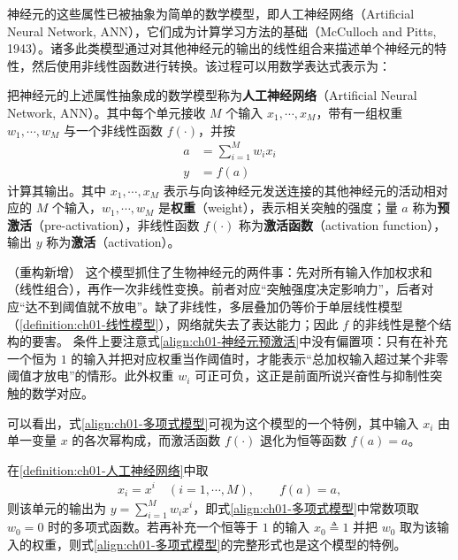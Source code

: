\documentclass[../../main.tex]{subfiles}
\begin{document}
神经元的这些属性已被抽象为简单的数学模型，即人工神经网络（Artificial Neural Network, ANN），它们成为计算学习方法的基础（McCulloch and Pitts, 1943）。诸多此类模型通过对其他神经元的输出的线性组合来描述单个神经元的特性，然后使用非线性函数进行转换。该过程可以用数学表达式表示为：

\begin{definition}[人工神经网络]\label{definition:ch01-人工神经网络}
把神经元的上述属性抽象成的数学模型称为\textbf{人工神经网络}（Artificial Neural Network, ANN）。其中每个单元接收 $M$ 个输入 $x_1,\cdots,x_M$，带有一组权重 $w_1,\cdots,w_M$ 与一个非线性函数 $f(\cdot)$，并按
\begin{align}
  a &= \sum_{i=1}^{M} w_i x_i \label{align:ch01-神经元预激活}\\
  y &= f(a) \label{align:ch01-神经元激活}
\end{align}
计算其输出。其中 $x_1,\cdots,x_M$ 表示与向该神经元发送连接的其他神经元的活动相对应的 $M$ 个输入，$w_1,\cdots,w_M$ 是\textbf{权重}（weight），表示相关突触的强度；量 $a$ 称为\textbf{预激活}（pre-activation），非线性函数 $f(\cdot)$ 称为\textbf{激活函数}（activation function），输出 $y$ 称为\textbf{激活}（activation）。
\end{definition}

\begin{remark}（重构新增）
这个模型抓住了生物神经元的两件事：先对所有输入作加权求和（线性组合），再作一次非线性变换。前者对应“突触强度决定影响力”，后者对应“达不到阈值就不放电”。缺了非线性，多层叠加仍等价于单层线性模型（\cref{definition:ch01-线性模型}），网络就失去了表达能力；因此 $f$ 的非线性是整个结构的要害。
条件上要注意式\eqref{align:ch01-神经元预激活}中没有偏置项：只有在补充一个恒为 $1$ 的输入并把对应权重当作阈值时，才能表示“总加权输入超过某个非零阈值才放电”的情形。此外权重 $w_i$ 可正可负，这正是前面所说兴奋性与抑制性突触的数学对应。
\end{remark}

可以看出，式\eqref{align:ch01-多项式模型}可视为这个模型的一个特例，其中输入 $x_i$ 由单一变量 $x$ 的各次幂构成，而激活函数 $f(\cdot)$ 退化为恒等函数 $f(a)=a$。

\begin{proposition}[多项式函数是神经元模型的特例]\label{proposition:ch01-多项式是神经元特例}
在\cref{definition:ch01-人工神经网络}中取
\begin{align*}
  x_i = x^{i}\quad (i=1,\cdots,M),\qquad f(a)=a,
\end{align*}
则该单元的输出为 $y=\sum_{i=1}^{M} w_i x^{i}$，即式\eqref{align:ch01-多项式模型}中常数项取 $w_0=0$ 时的多项式函数。若再补充一个恒等于 $1$ 的输入 $x_0\triangleq 1$ 并把 $w_0$ 取为该输入的权重，则式\eqref{align:ch01-多项式模型}的完整形式也是这个模型的特例。
\end{proposition}
\end{document}
